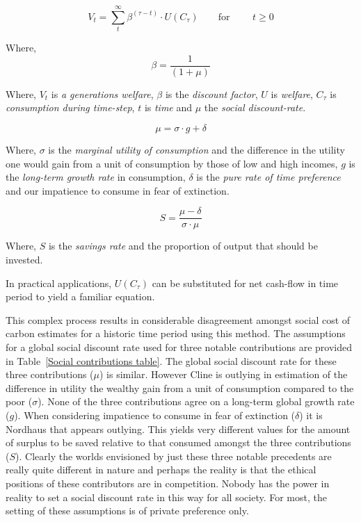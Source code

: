 \documentclass[11pt, oneside]{book}   	%
\begin{document}
\begin{equation}
V_t = \sum_t^\infty \beta^{(\tau - t)} \cdot U (C_\tau)
\qquad \text{for }
\qquad t \geq 0
\end{equation}

Where,
\begin{equation}
\beta = \frac{1}{(1+\mu)}
\end{equation}

Where, $V_t$ is \emph{a generations welfare}, $\beta$ is the \emph{discount factor}, $U$ is \emph{welfare}, $C_\tau$ is \emph{consumption during time-step}, $t$ is \emph{time} and $\mu$ the \emph{social discount-rate}.

\begin{equation}
\mu = \sigma \cdot g + \delta
\end{equation}

Where, $\sigma$ is the \emph{marginal utility of consumption} and the difference in the utility one would gain from a unit of consumption by those of low and high incomes, $g$ is the \emph{long-term growth rate} in consumption, $\delta$ is the \emph{pure rate of time preference} and our impatience to consume in fear of extinction.

\begin{equation}
S = \frac{\mu-\delta}{\sigma \cdot \mu}
\end{equation}

Where, $S$ is the \emph{savings rate} and the proportion of output that should be invested.\par

In practical applications, $U (C_\tau)$ can be substituted for net cash-flow in time period to yield a familiar equation.\par

This complex process results in considerable disagreement amongst social cost of carbon estimates for a historic time period using this method.
The assumptions for a global social discount rate used for three notable contributions are provided in Table~\ref{Social contributions table}.
The global social discount rate for these three contributions ($\mu$) is similar. However Cline is outlying in estimation of the difference in utility the wealthy gain from a unit of consumption compared to the poor ($\sigma$). None of the three contributions agree on a long-term global growth rate ($g$). When considering impatience to consume in fear of extinction ($\delta$) it is Nordhaus that appears outlying. This yields very different values for the amount of surplus to be saved relative to that consumed amongst the three contributions ($S$). Clearly the worlds envisioned by just these three notable precedents are really quite different in nature and perhaps the reality is that the ethical positions of these contributors are in competition. Nobody has the power in reality to set a social discount rate in this way for all society. For most, the setting of these assumptions is of private preference only.
\end{document}
